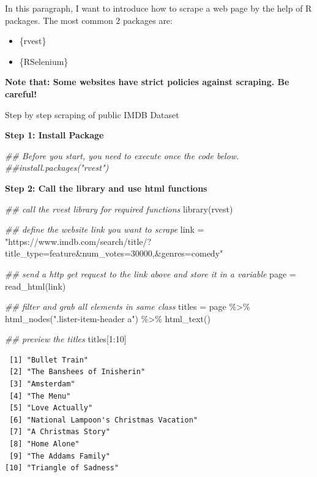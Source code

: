 \documentclass[
  letterpaper,
  DIV=11,
  numbers=noendperiod]{scrreprt}
\newenvironment{Shaded}{\begin{snugshade}}{\end{snugshade}}
\newcommand{\DecValTok}[1]{\textcolor[rgb]{0.68,0.00,0.00}{#1}}
\newcommand{\DocumentationTok}[1]{\textcolor[rgb]{0.37,0.37,0.37}{\textit{#1}}}
\newcommand{\FunctionTok}[1]{\textcolor[rgb]{0.28,0.35,0.67}{#1}}
\newcommand{\NormalTok}[1]{\textcolor[rgb]{0.00,0.23,0.31}{#1}}
\newcommand{\OtherTok}[1]{\textcolor[rgb]{0.00,0.23,0.31}{#1}}
\newcommand{\SpecialCharTok}[1]{\textcolor[rgb]{0.37,0.37,0.37}{#1}}
\newcommand{\StringTok}[1]{\textcolor[rgb]{0.13,0.47,0.30}{#1}}
\providecommand{\tightlist}{%
  \setlength{\itemsep}{0pt}\setlength{\parskip}{0pt}}\usepackage{longtable,booktabs,array}
\begin{document}
In this paragraph, I want to introduce how to scrape a web page by the
help of R packages. The most common 2 packages are:

\begin{itemize}
\tightlist
\item
  \{rvest\}
\item
  \{RSelenium\}
\end{itemize}

\textbf{Note that: Some websites have strict policies against scraping.
Be careful!}

Step by step scraping of public IMDB Dataset

\textbf{Step 1: Install Package}

\begin{Shaded}
\begin{Highlighting}[]
\DocumentationTok{\#\# Before you start, you need to execute once the code below.}
\DocumentationTok{\#\#install.packages("rvest")}
\end{Highlighting}
\end{Shaded}

\textbf{Step 2: Call the library and use html functions}

\begin{Shaded}
\begin{Highlighting}[]
\DocumentationTok{\#\# call the rvest library for required functions}
\FunctionTok{library}\NormalTok{(rvest)}

\DocumentationTok{\#\# define the website link you want to scrape}
\NormalTok{link }\OtherTok{=} \StringTok{"https://www.imdb.com/search/title/?title\_type=feature\&num\_votes=30000,\&genres=comedy"}

\DocumentationTok{\#\# send a http get request to the link above and store it in a variable}
\NormalTok{page }\OtherTok{=} \FunctionTok{read\_html}\NormalTok{(link)}

\DocumentationTok{\#\# filter and grab all elements in same class}
\NormalTok{titles }\OtherTok{=}\NormalTok{ page }\SpecialCharTok{\%\textgreater{}\%} \FunctionTok{html\_nodes}\NormalTok{(}\StringTok{".lister{-}item{-}header a"}\NormalTok{) }\SpecialCharTok{\%\textgreater{}\%} \FunctionTok{html\_text}\NormalTok{()}

\DocumentationTok{\#\# preview the titles}
\NormalTok{titles[}\DecValTok{1}\SpecialCharTok{:}\DecValTok{10}\NormalTok{]}
\end{Highlighting}
\end{Shaded}

\begin{verbatim}
 [1] "Bullet Train"                         
 [2] "The Banshees of Inisherin"            
 [3] "Amsterdam"                            
 [4] "The Menu"                             
 [5] "Love Actually"                        
 [6] "National Lampoon's Christmas Vacation"
 [7] "A Christmas Story"                    
 [8] "Home Alone"                           
 [9] "The Addams Family"                    
[10] "Triangle of Sadness"                  
\end{verbatim}
\end{document}

